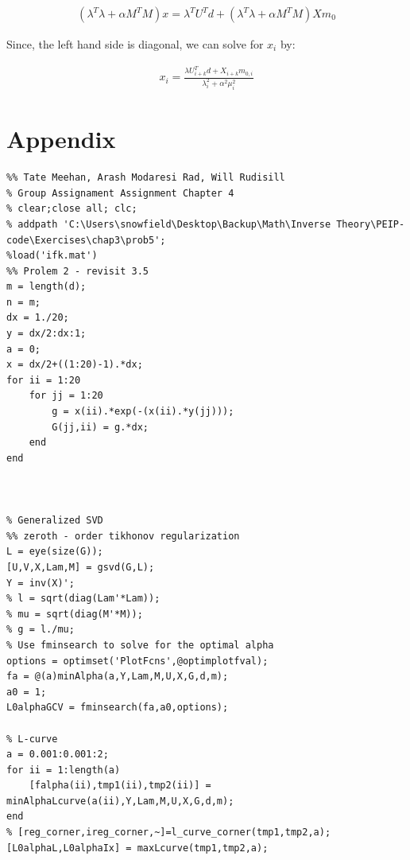 \documentclass{article}
\begin{document}
\begin{align}
(\lambda^T\lambda + \alpha M^TM)x = \lambda^TU^Td + (\lambda^T\lambda + \alpha M^TM)Xm_0
\end{align}

Since, the left hand side is diagonal, we can solve for $x_i$ by: 

\begin{align}
x_i = \frac{\lambda U^T_{i+k}d + X_{i+k}m_{0,i}}{\lambda_i^2 + \alpha^2\mu_i^2}
\end{align}


\section*{Appendix}
\begin{verbatim}
%% Tate Meehan, Arash Modaresi Rad, Will Rudisill
% Group Assignament Assignment Chapter 4
% clear;close all; clc;
% addpath 'C:\Users\snowfield\Desktop\Backup\Math\Inverse Theory\PEIP-code\Exercises\chap3\prob5';
%load('ifk.mat')
%% Prolem 2 - revisit 3.5
m = length(d);
n = m;
dx = 1./20;
y = dx/2:dx:1;
a = 0;
x = dx/2+((1:20)-1).*dx;
for ii = 1:20
    for jj = 1:20
        g = x(ii).*exp(-(x(ii).*y(jj)));
        G(jj,ii) = g.*dx;
    end
end



% Generalized SVD
%% zeroth - order tikhonov regularization
L = eye(size(G)); 
[U,V,X,Lam,M] = gsvd(G,L);
Y = inv(X)';
% l = sqrt(diag(Lam'*Lam));
% mu = sqrt(diag(M'*M));
% g = l./mu;
% Use fminsearch to solve for the optimal alpha
options = optimset('PlotFcns',@optimplotfval);
fa = @(a)minAlpha(a,Y,Lam,M,U,X,G,d,m);
a0 = 1;
L0alphaGCV = fminsearch(fa,a0,options);

% L-curve
a = 0.001:0.001:2;
for ii = 1:length(a)
    [falpha(ii),tmp1(ii),tmp2(ii)] = minAlphaLcurve(a(ii),Y,Lam,M,U,X,G,d,m);
end
% [reg_corner,ireg_corner,~]=l_curve_corner(tmp1,tmp2,a);
[L0alphaL,L0alphaIx] = maxLcurve(tmp1,tmp2,a);


\end{verbatim}
\end{document}
